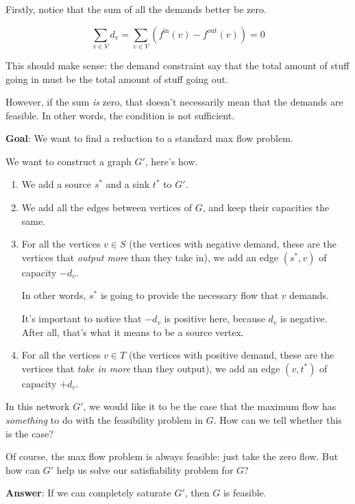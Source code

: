 \documentclass[12pt]{article}
\begin{document}
  Firstly, notice that the sum of all the demands better be zero.

  \[
    \sum_{v \in V} d_v = \sum_{v \in V} \left(f^\text{in}(v) - f^\text{out}(v)\right) = 0
  \]

  This should make sense: the demand constraint say that the total amount of
  stuff going in must be the total amount of stuff going out. 

  However, if the sum {\it is} zero, that doesn't necessarily mean that the
  demands are feasible. In other words, the condition is not sufficient.

  {\bf Goal}: We want to find a reduction to a standard max flow problem.

  We want to construct a graph $G'$, here's how. 

  \begin{enumerate}
    \item We add a source $s^*$ and a sink $t^*$ to $G'$.

    \item We add all the edges between vertices of $G$, and keep their
      capacities the same.

    \item For all the vertices $v \in S$ (the vertices with negative demand,
      these are the vertices that {\it output more} than they take in), we add
      an edge $(s^*, v)$ of capacity $-d_v$.

      In other words, $s^*$ is going to provide the necessary 
      flow that $v$ demands.

      It's important to notice that $-d_v$ is positive here, because $d_v$ is
      negative. After all, that's what it means to be a source vertex.

    \item For all the vertices $v \in T$ (the vertices with positive demand,
      these are the vertices that {\it take in more} than they output), we add
      an edge $(v, t^*)$ of capacity $+d_v$.
  \end{enumerate}

  In this network $G'$, we would like it to be the case that the maximum flow
  has {\it something} to do with the feasibility problem in $G$. How can we
  tell whether this is the case?

  Of course, the max flow problem is always feasible: just take the zero flow.
  But how can $G'$ help us solve our satisfiability problem for $G$?

  {\bf Answer}: If we can completely saturate $G'$, then $G$ is feasible.
\end{document}
